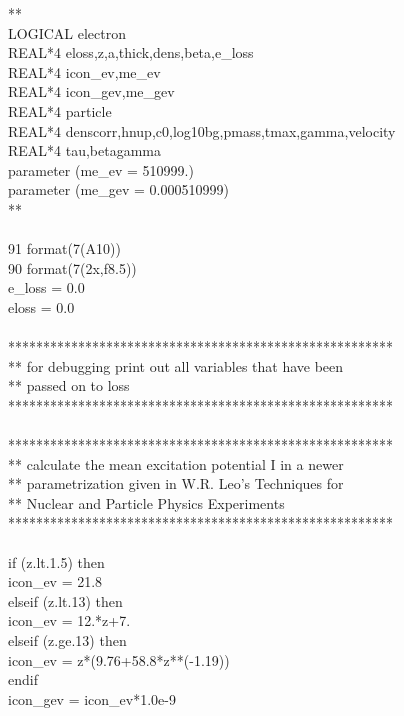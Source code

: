 {**\\
      LOGICAL electron\\
      REAL*4 eloss,z,a,thick,dens,beta,e\_loss\\
      REAL*4 icon\_ev,me\_ev\\
      REAL*4 icon\_gev,me\_gev\\
      REAL*4 particle\\
      REAL*4 denscorr,hnup,c0,log10bg,pmass,tmax,gamma,velocity\\
      REAL*4 tau,betagamma\\
      parameter (me\_ev = 510999.)\\
      parameter (me\_gev = 0.000510999)\\
**\\
 \\
 91   format(7(A10))\\
 90   format(7(2x,f8.5))\\
      e\_loss = 0.0\\
      eloss  = 0.0\\
 \\
*******************************************************\\
** for debugging print out all variables that have been\\
** passed on to loss\\
*******************************************************\\
 \\
*******************************************************\\
** calculate the mean excitation potential I in a newer \\
** parametrization given in W.R. Leo's Techniques for \\
** Nuclear and Particle Physics Experiments\\
*******************************************************\\
 \\
      if (z.lt.1.5) then\\
         icon\_ev = 21.8\\
      elseif (z.lt.13) then\\
         icon\_ev = 12.*z+7.\\
      elseif (z.ge.13) then\\
         icon\_ev = z*(9.76+58.8*z**(-1.19))\\
      endif\\
      icon\_gev = icon\_ev*1.0e-9\\
}
